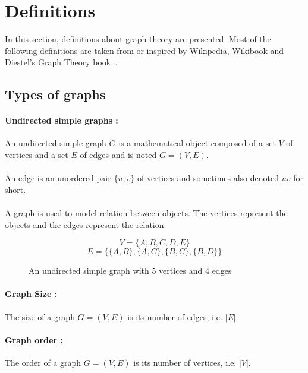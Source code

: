 \section{Definitions}
In this section, definitions about graph theory are presented. Most
of the following definitions are taken from or inspired by Wikipedia,
Wikibook and Diestel's Graph Theory book~\cite{Diestel}.

\subsection{Types of graphs}
\paragraph{Undirected simple graphs :}
An undirected simple graph $G$ is a mathematical object composed of a set $V$ of
vertices and a set $E$ of edges and is noted $G = (V,E)$.

\paragraph{}
An edge is an unordered pair $\{u,v\}$ of vertices and sometimes also denoted 
$uv$ for short.

\paragraph{}
A graph is used to model relation between objects. The vertices represent the 
objects and the edges represent the relation.


\begin{figure}[!h]
  \begin{center}
    
  \end{center}
  $$V = \{A,B,C,D,E\}$$
  $$E = \Big\{\{A,B\},\{A,C\},\{B,C\},\{B,D\}\Big\}$$
  \caption{An undirected simple graph with 5 vertices and 4 edges}
\end{figure}

\paragraph{Graph Size :}
The size of a graph $G=(V,E)$ is its number of edges, i.e. $|E|$.

\paragraph{Graph order :}
The order of a graph $G=(V,E)$ is its number of vertices, i.e. $|V|$.

